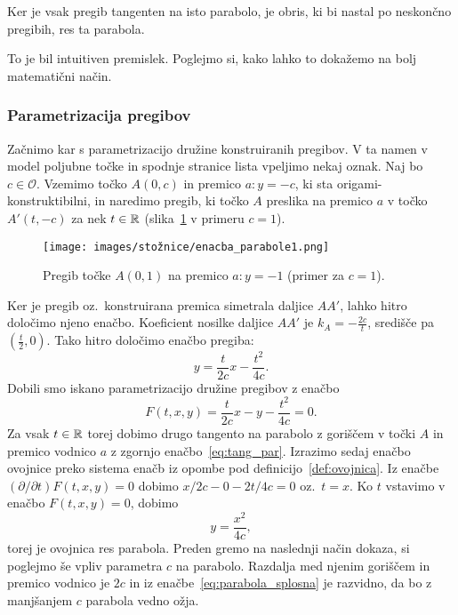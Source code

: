Ker je vsak pregib tangenten na isto parabolo, je obris, ki bi nastal po neskončno pregibih, res ta parabola.

To je bil intuitiven premislek. Poglejmo si, kako lahko to dokažemo na bolj matematični način.

\subsubsection*{Parametrizacija pregibov}

Začnimo kar s parametrizacijo družine konstruiranih pregibov. V ta namen v model poljubne točke in spodnje stranice lista vpeljimo nekaj oznak. Naj bo $c \in \mathcal{O}$. Vzemimo točko $A(0, c)$ in premico $a: y = -c$, ki sta origami-konstruktibilni, in naredimo pregib, ki točko $A$ preslika na premico $a$ v točko $A'(t, -c)$ za nek $t \in \mathbb R$ (slika~\ref{fig:enacba_tangente_par1} v primeru $c = 1$).

\begin{figure}[h]
    \centering
    \texttt{[image: images/stožnice/enacba\_parabole1.png]}
    \caption[Enačba tangente na parabolo]{Pregib točke $A(0, 1)$ na premico $a: y = -1$ (primer za $c = 1$).}
    \label{fig:enacba_tangente_par1}
\end{figure}

Ker je pregib oz.\ konstruirana premica simetrala daljice $AA'$, lahko hitro določimo njeno enačbo. Koeficient nosilke daljice $AA'$ je $k_A = -\frac{2c}{t}$, središče pa $(\frac{t}{2}, 0)$. Tako hitro določimo enačbo pregiba:
\begin{equation}
    y = \frac{t}{2c} x - \frac{t^2}{4c}.
    \label{eq:tang_par}
\end{equation}
Dobili smo iskano parametrizacijo družine pregibov z enačbo
$$F(t, x, y) = \frac{t}{2c} x - y - \frac{t^2}{4c} = 0. $$
Za vsak $t \in \mathbb R$ torej dobimo drugo tangento na parabolo z goriščem v točki $A$ in premico vodnico $a$ z zgornjo enačbo~\ref{eq:tang_par}. Izrazimo sedaj enačbo ovojnice preko sistema enačb iz opombe pod definicijo~\ref{def:ovojnica}. Iz enačbe $(\partial / \partial t) F(t, x, y) = 0$ dobimo $x/2c - 0 - 2t/4c = 0$ oz.\ $t = x$. Ko $t$ vstavimo v enačbo $F(t, x, y) = 0$, dobimo
\begin{equation}
    \label{eq:parabola_splosna}
    y = \frac{x^2}{4c},
\end{equation}
torej je ovojnica res parabola. Preden gremo na naslednji način dokaza, si poglejmo še vpliv parametra $c$ na parabolo. Razdalja med njenim goriščem in premico vodnico je $2c$ in iz enačbe~\ref{eq:parabola_splosna} je razvidno, da bo z manjšanjem $c$ parabola vedno ožja.

